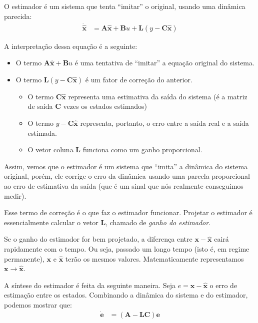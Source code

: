 \documentclass[
]{book}
\providecommand{\tightlist}{%
  \setlength{\itemsep}{0pt}\setlength{\parskip}{0pt}}
\begin{document}
O estimador é um sistema que tenta ``imitar'' o original, usando uma
dinâmica parecida: \[
\begin{align*}
    \dot{\mathbf{\hat{x}}} &= \mathbf{A\hat{x}+B}u+\mathbf{L}(y-\mathbf{C\hat{x}})
\end{align*}
\]

A interpretação dessa equação é a seguinte:

\begin{itemize}
\tightlist
\item
  O termo \(\mathbf{A\hat{x}+B}u\) é uma tentativa de ``imitar'' a equação
  original do sistema.
\item
  O termo \(\mathbf{L}(y-\mathbf{C\hat{x}})\) é um fator de correção do
  anterior.

  \begin{itemize}
  \tightlist
  \item
    O termo \(\mathbf{C\hat{x}}\) representa uma estimativa da saída
    do sistema (é a matriz de saída \(\mathbf{C}\) vezes os estados
    estimados)
  \item
    O termo \(y-\mathbf{C\hat{x}}\) representa, portanto, o erro entre
    a saída real e a saída estimada.
  \item
    O vetor coluna \(\mathbf{L}\) funciona como um ganho proporcional.
  \end{itemize}
\end{itemize}

Assim, vemos que o estimador é um sistema que ``imita'' a dinâmica do
sistema original, porém, ele corrige o erro da dinâmica usando uma
parcela proporcional ao erro de estimativa da saída (que é um sinal que
nós realmente conseguimos medir).

Esse termo de correção é o que faz o estimador funcionar. Projetar o
estimador é essencialmente calcular o vetor \(\mathbf{L}\), chamado de
\emph{ganho do estimador}.

Se o ganho do estimador for bem projetado, a diferença entre
\(\mathbf{x}-\mathbf{\hat{x}}\) cairá rapidamente com o tempo. Ou seja,
passado um longo tempo (isto é, em regime permanente), \(\mathbf{x}\) e
\(\mathbf{\hat{x}}\) terão os mesmos valores. Matematicamente
representamos \(\mathbf{x}\rightarrow \mathbf{\hat{x}}\).



A síntese do estimador é feita da seguinte maneira. Seja
\(e = \mathbf{x}-\mathbf{\hat{x}}\) o erro de estimação entre os estados.
Combinando a dinâmica do sistema e do estimador, podemos mostrar que: \[
\begin{align*}
    \dot{\mathbf{e}} &= \mathbf{(A-LC)e}
\end{align*}
\]
\end{document}
